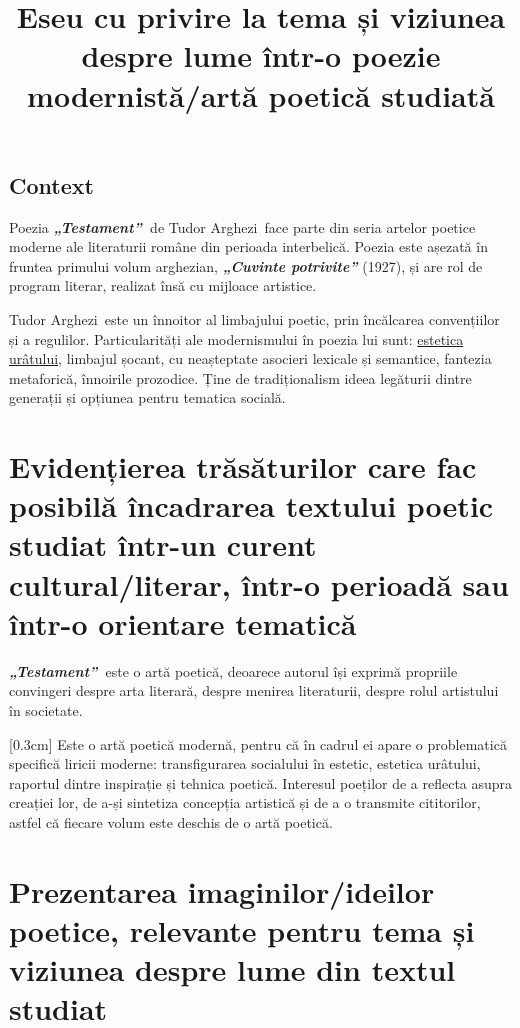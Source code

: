 \documentclass[
12pt,
a4paper
]{article}
\title{Eseu cu privire la tema și viziunea despre lume într-o poezie modernistă/artă poetică studiată}
\date{}   %
\author{} %
\newcommand{\operatitle}{\textbf{\textit{„Testament”\ }}} %
\newcommand{\operaauthor}{Tudor Arghezi\ } %
\begin{document}
\maketitle %



\subsection{Context}

Poezia \operatitle de \operaauthor face parte din seria artelor poetice moderne ale literaturii române din perioada interbelică. Poezia este așezată în fruntea primului volum arghezian, \textbf{\textit{„Cuvinte potrivite”}} (1927), și are rol de program literar, realizat însă cu mijloace artistice.

\operaauthor este un înnoitor al limbajului poetic, prin încălcarea convențiilor și a regulilor. Particularități ale modernismului în poezia lui sunt: \underline{estetica urâtului}, limbajul șocant, cu neașteptate asocieri lexicale și semantice, fantezia metaforică, înnoirile prozodice. Ține de tradiționalism ideea legăturii dintre generații și opțiunea pentru tematica socială.

\section{Evidențierea trăsăturilor care fac posibilă încadrarea textului poetic studiat într-un curent cultural/literar, într-o perioadă sau într-o orientare tematică}

\operatitle este o artă poetică, deoarece autorul își exprimă propriile convingeri despre arta literară, despre menirea literaturii, despre rolul artistului în societate.

[0.3cm]
Este o artă poetică modernă, pentru că în cadrul ei apare o problematică specifică liricii moderne: transfigurarea socialului în estetic, estetica urâtului, raportul dintre inspirație și tehnica poetică. Interesul poeților de a reflecta asupra creației lor, de a-și sintetiza concepția artistică și de a o transmite cititorilor, astfel că fiecare volum este deschis de o artă poetică.

\section{Prezentarea imaginilor/ideilor poetice, relevante pentru tema și viziunea despre lume din textul studiat}
\end{document}
